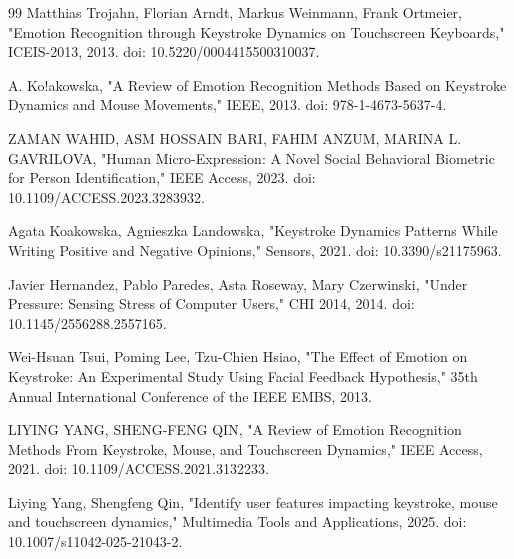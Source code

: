 \documentclass[conference]{IEEEtran}
\begin{document}
\begin{thebibliography}{99}
Matthias Trojahn, Florian Arndt, Markus Weinmann, Frank Ortmeier, "Emotion Recognition through Keystroke Dynamics on Touchscreen Keyboards," ICEIS-2013, 2013. doi: 10.5220/0004415500310037.

A. Ko!akowska, "A Review of Emotion Recognition Methods Based on Keystroke Dynamics and Mouse Movements," IEEE, 2013. doi: 978-1-4673-5637-4.

ZAMAN WAHID, ASM HOSSAIN BARI, FAHIM ANZUM, MARINA L. GAVRILOVA, "Human Micro-Expression: A Novel Social Behavioral Biometric for Person Identification," IEEE Access, 2023. doi: 10.1109/ACCESS.2023.3283932.

Agata Koakowska, Agnieszka Landowska, "Keystroke Dynamics Patterns While Writing Positive and Negative Opinions," Sensors, 2021. doi: 10.3390/s21175963.

Javier Hernandez, Pablo Paredes, Asta Roseway, Mary Czerwinski, "Under Pressure: Sensing Stress of Computer Users," CHI 2014, 2014. doi: 10.1145/2556288.2557165.

Wei-Hsuan Tsui, Poming Lee, Tzu-Chien Hsiao, "The Effect of Emotion on Keystroke: An Experimental Study Using Facial Feedback Hypothesis," 35th Annual International Conference of the IEEE EMBS, 2013.

LIYING YANG, SHENG-FENG QIN, "A Review of Emotion Recognition Methods From Keystroke, Mouse, and Touchscreen Dynamics," IEEE Access, 2021. doi: 10.1109/ACCESS.2021.3132233.

Liying Yang, Shengfeng Qin, "Identify user features impacting keystroke, mouse and touchscreen dynamics," Multimedia Tools and Applications, 2025. doi: 10.1007/s11042-025-21043-2.

\end{thebibliography}
\end{document}
